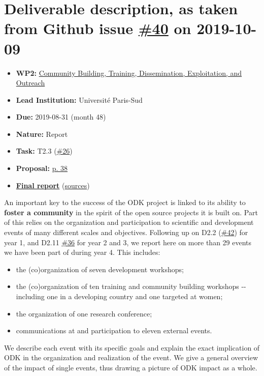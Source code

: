 \hypertarget{deliverable-description-as-taken-from-github-issue-40-on-2019-10-09}{%
\section*{\texorpdfstring{Deliverable description, as taken from Github
issue
\href{https://github.com/OpenDreamKit/OpenDreamKit/issues/40}{\#40} on
2019-10-09}{Deliverable description, as taken from Github issue \#40 on 2019-10-09}}\label{deliverable-description-as-taken-from-github-issue-40-on-2019-10-09}}

\begin{itemize}
\tightlist
\item
  \textbf{WP2:}
  \href{https://github.com/OpenDreamKit/OpenDreamKit/tree/master/WP2}{Community
  Building, Training, Dissemination, Exploitation, and Outreach}
\item
  \textbf{Lead Institution:} Université Paris-Sud
\item
  \textbf{Due:} 2019-08-31 (month 48)
\item
  \textbf{Nature:} Report
\item
  \textbf{Task:} T2.3
  (\href{https://github.com/OpenDreamKit/OpenDreamKit/issues/26}{\#26})
\item
  \textbf{Proposal:}
  \href{https://github.com/OpenDreamKit/OpenDreamKit/raw/master/Proposal/proposal-www.pdf}{p.
  38}
\item
  \textbf{\href{https://github.com/OpenDreamKit/OpenDreamKit/raw/master/WP2/D2.15/report-final.pdf}{Final
  report}}
  (\href{https://github.com/OpenDreamKit/OpenDreamKit/raw/master/WP2/D2.15/}{sources})
\end{itemize}

An important key to the success of the ODK project is linked to its
ability to \textbf{foster a community} in the spirit of the open source
projects it is built on. Part of this relies on the organization and
participation to scientific and development events of many different
scales and objectives. Following up on D2.2
(\href{https://github.com/OpenDreamKit/OpenDreamKit/issues/42}{\#42})
for year 1, and D2.11
\href{https://github.com/OpenDreamKit/OpenDreamKit/issues/36}{\#36} for
year 2 and 3, we report here on more than 29 events we have been part of
during year 4. This includes:

\begin{itemize}
\tightlist
\item
  the (co)organization of seven development workshops;
\item
  the (co)organization of ten training and community building workshops
  -\/- including one in a developing country and one targeted at women;
\item
  the organization of one research conference;
\item
  communications at and participation to eleven external events.
\end{itemize}

We describe each event with its specific goals and explain the exact
implication of ODK in the organization and realization of the event. We
give a general overview of the impact of single events, thus drawing a
picture of ODK impact as a whole.
